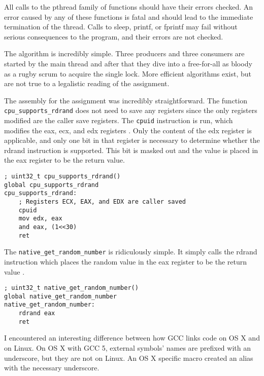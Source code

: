 \documentclass[10pt,conference,draftclsnofoot,onecolumn]{IEEEtran}
\begin{document}
All calls to the pthread family of functions should have their errors checked. An error caused by any of these functions is fatal and should lead to the immediate termination of the thread. Calls to sleep, printf, or fprintf may fail without serious consequences to the program, and their errors are not checked.

The algorithm is incredibly simple. Three producers and three consumers are started by the main thread and after that they dive into a free-for-all as bloody as a rugby scrum to acquire the single lock. More efficient algorithms exist, but are not true to a legalistic reading of the assignment.

The assembly for the assignment was incredibly straightforward. The function \texttt{cpu\_supports\_rdrand} does not need to save any registers since the only registers modified are the caller save registers. The \texttt{cpuid} instruction is run, which modifies the eax, ecx, and edx registers \cite{2_intel}. Only the content of the edx register is applicable, and only one bit in that register is necessary to determine whether the rdrand instruction is supported. This bit is masked out and the value is placed in the eax register to be the return value.

\begin{lstlisting}
; uint32_t cpu_supports_rdrand()
global cpu_supports_rdrand
cpu_supports_rdrand:
	; Registers ECX, EAX, and EDX are caller saved
	cpuid
	mov edx, eax
	and eax, (1<<30)
	ret
\end{lstlisting}

The \texttt{native\_get\_random\_number} is ridiculously simple. It simply calls the rdrand instruction which places the random value in the eax register to be the return value \cite{1_intel}.
\begin{lstlisting}
; uint32_t native_get_random_number()
global native_get_random_number
native_get_random_number:
	rdrand eax
	ret
\end{lstlisting}

I encountered an interesting difference between how GCC links code on OS X and on Linux. On OS X with GCC 5, external symbols' names are prefixed with an underscore, but they are not on Linux. An OS X specific macro created an alias with the necessary underscore.
\end{document}
